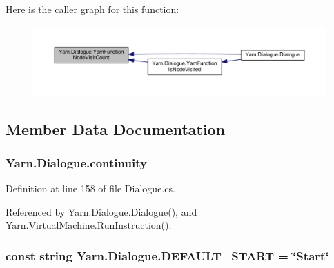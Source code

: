 Here is the caller graph for this function\-:
\nopagebreak
\begin{figure}[H]
\begin{center}
\leavevmode
\includegraphics[width=350pt]{a00090_a10c9f22d3f55e74f091cd6069c431094_icgraph}
\end{center}
\end{figure}




\subsection{Member Data Documentation}
\hypertarget{a00090_ae94eaa4b03b432422f5d205fabe37ff5}{
\subsubsection[{continuity}]{ Yarn.\-Dialogue.\-continuity\hspace{0.3cm}{\ttfamily [package]}}}\label{a00090_ae94eaa4b03b432422f5d205fabe37ff5}


Definition at line 158 of file Dialogue.\-cs.



Referenced by Yarn.\-Dialogue.\-Dialogue(), and Yarn.\-Virtual\-Machine.\-Run\-Instruction().

\hypertarget{a00090_a1b643f15f734090e6a58cbf13dafd28f}{
\subsubsection[{D\-E\-F\-A\-U\-L\-T\-\_\-\-S\-T\-A\-R\-T}]{\setlength{\rightskip}{0pt plus 5cm}const string Yarn.\-Dialogue.\-D\-E\-F\-A\-U\-L\-T\-\_\-\-S\-T\-A\-R\-T = \char`\"{}Start\char`\"{}}}\label{a00090_a1b643f15f734090e6a58cbf13dafd28f}


